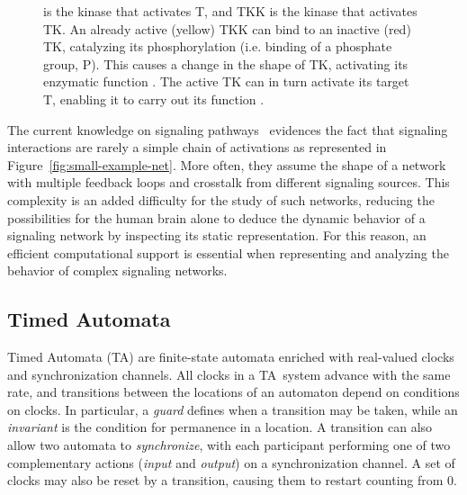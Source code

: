 \documentclass{llncs}
\newcommand{\ta}{Timed Automaton}
\newcommand{\tas}{Timed Automata}
\begin{document}
\begin{figure}[htbp]
{is the kinase that activates {\sf T}, and {\sf TKK} is the kinase that activates {\sf TK}.
{\bf\protect{}} An already active (yellow) {\sf TKK} can bind to
an inactive (red) {\sf TK}, catalyzing its phosphorylation (i.e. binding of a phosphate group, {\sf P}).
This causes a change in the shape of {\sf TK}, activating its enzymatic function {\bf\protect{}}.
The active {\sf TK} can in turn activate its target {\sf T}, enabling it to carry out its function {\bf\protect{}}.
}\label{fig:small-example-biology}
\end{figure}


The current knowledge on signaling pathways~\cite{kegg,phosphosite} evidences the fact
that signaling interactions are rarely a simple chain of activations as represented in Figure~\ref{fig:small-example-net}.
More often, they assume the shape of a network with multiple feedback loops and crosstalk from different signaling sources.
This complexity is an added difficulty for the study of such networks, reducing the possibilities for the human brain alone
to deduce the dynamic behavior of a signaling network by inspecting its static representation.
For this reason, an efficient computational support is essential when representing and analyzing the behavior
of complex signaling networks.


\subsection{\tas}\label{sec:TA}
\renewcommand{\ta}{TA}
\renewcommand{\tas}{TA}
Timed Automata (\tas) are finite-state automata enriched with real-valued clocks
and synchronization channels. All clocks in a \tas\ system advance with the same rate,
and transitions between the locations of an automaton
depend on conditions on clocks. In particular, a \emph{guard} defines when a transition
may be taken, while an \emph{invariant} is the condition for permanence in a location.
A transition can also allow two automata to \emph{synchronize},
with each participant performing one of two complementary actions (\emph{input} and \emph{output})
on a synchronization channel. A set of clocks may also be reset by a transition, causing them to restart counting from 0.
\end{document}
